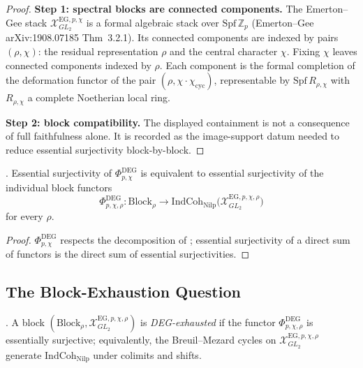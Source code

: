\begin{proof}
\textbf{Step 1: spectral blocks are connected components.} The
Emerton--Gee stack \(\mathcal{X}^{\mathrm{EG},p,\chi}_{GL_{2}}\) is a
formal algebraic stack over \(\mathrm{Spf}\,\mathbb{Z}_{p}\)
(Emerton--Gee arXiv:1908.07185 Thm~3.2.1). Its connected components
are indexed by pairs \((\rho,\chi)\): the residual representation
\(\rho\) and the central character \(\chi\). Fixing \(\chi\) leaves
connected components indexed by \(\rho\). Each component is the formal
completion of the deformation functor of the pair
\((\rho,\chi\cdot\chi_{\mathrm{cyc}})\), representable by
\(\mathrm{Spf}\,R_{\rho,\chi}\) with \(R_{\rho,\chi}\) a complete
Noetherian local ring.

\textbf{Step 2: block compatibility.} The displayed containment is
not a consequence of full faithfulness alone.  It is recorded as the
image-support datum needed to reduce essential surjectivity
block-by-block.
\end{proof}

\begin{corollary}
\label{v4-arith:deg-f1a:cor:ess-surj-block-by-block}
\ClaimStatusProvedHere. Essential surjectivity of
\(\Phi^{\mathrm{DEG}}_{p,\chi}\) is equivalent to essential
surjectivity of the individual block functors
\begin{equation}
\Phi^{\mathrm{DEG}}_{p,\chi,\rho}\colon\mathrm{Block}_{\rho}\to\mathrm{IndCoh}_{\mathrm{Nilp}}\bigl(\mathcal{X}^{\mathrm{EG},p,\chi,\rho}_{GL_{2}}\bigr)
\end{equation}
for every \(\rho\).
\end{corollary}

\begin{proof}
\(\Phi^{\mathrm{DEG}}_{p,\chi}\) respects the decomposition of
; essential surjectivity
of a direct sum of functors is the direct sum of essential
surjectivities.
\end{proof}

\subsection{The Block-Exhaustion Question}

\begin{definition}
\label{v4-arith:deg-f1a:def:block-exhaustion}
\ClaimStatusDefinitional. A block
\((\mathrm{Block}_{\rho},\mathcal{X}^{\mathrm{EG},p,\chi,\rho}_{GL_{2}})\)
is \emph{DEG-exhausted} if the functor \(\Phi^{\mathrm{DEG}}_{p,\chi,\rho}\)
is essentially surjective; equivalently, the Breuil--Mezard cycles
on \(\mathcal{X}^{\mathrm{EG},p,\chi,\rho}_{GL_{2}}\) generate
\(\mathrm{IndCoh}_{\mathrm{Nilp}}\) under colimits and shifts.
\end{definition}

